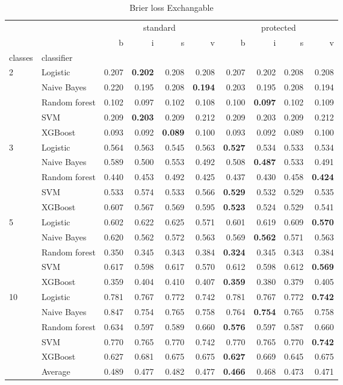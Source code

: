 \begin{table}
\caption{Brier loss Exchangable}
\begin{tabular}{l|l|rrrr|rrrr}
\toprule
 &  & \multicolumn{4}{c}{standard} & \multicolumn{4}{c}{protected} \\
 &  & b & i & s & v & b & i & s & v \\
classes & classifier &  &  &  &  &  &  &  &  \\
\midrule
\midrule
\multirow[c]{5}{*}{2} & Logistic & 0.207 & \textbf{0.202} & 0.208 & 0.208 & 0.207 & 0.202 & 0.208 & 0.208 \\
 & Naive Bayes & 0.220 & 0.195 & 0.208 & \textbf{0.194} & 0.203 & 0.195 & 0.208 & 0.194 \\
 & Random forest & 0.102 & 0.097 & 0.102 & 0.108 & 0.100 & \textbf{0.097} & 0.102 & 0.109 \\
 & SVM & 0.209 & \textbf{0.203} & 0.209 & 0.212 & 0.209 & 0.203 & 0.209 & 0.212 \\
 & XGBoost & 0.093 & 0.092 & \textbf{0.089} & 0.100 & 0.093 & 0.092 & 0.089 & 0.100 \\
\midrule
\multirow[c]{5}{*}{3} & Logistic & 0.564 & 0.563 & 0.545 & 0.563 & \textbf{0.527} & 0.534 & 0.533 & 0.534 \\
 & Naive Bayes & 0.589 & 0.500 & 0.553 & 0.492 & 0.508 & \textbf{0.487} & 0.533 & 0.491 \\
 & Random forest & 0.440 & 0.453 & 0.492 & 0.425 & 0.437 & 0.430 & 0.458 & \textbf{0.424} \\
 & SVM & 0.533 & 0.574 & 0.533 & 0.566 & \textbf{0.529} & 0.532 & 0.529 & 0.535 \\
 & XGBoost & 0.607 & 0.567 & 0.569 & 0.595 & \textbf{0.523} & 0.524 & 0.529 & 0.541 \\
\midrule
\multirow[c]{5}{*}{5} & Logistic & 0.602 & 0.622 & 0.625 & 0.571 & 0.601 & 0.619 & 0.609 & \textbf{0.570} \\
 & Naive Bayes & 0.620 & 0.562 & 0.572 & 0.563 & 0.569 & \textbf{0.562} & 0.571 & 0.563 \\
 & Random forest & 0.350 & 0.345 & 0.343 & 0.384 & \textbf{0.324} & 0.345 & 0.343 & 0.384 \\
 & SVM & 0.617 & 0.598 & 0.617 & 0.570 & 0.612 & 0.598 & 0.612 & \textbf{0.569} \\
 & XGBoost & 0.359 & 0.404 & 0.410 & 0.407 & \textbf{0.359} & 0.380 & 0.379 & 0.405 \\
\midrule
\multirow[c]{5}{*}{10} & Logistic & 0.781 & 0.767 & 0.772 & 0.742 & 0.781 & 0.767 & 0.772 & \textbf{0.742} \\
 & Naive Bayes & 0.847 & 0.754 & 0.765 & 0.758 & 0.764 & \textbf{0.754} & 0.765 & 0.758 \\
 & Random forest & 0.634 & 0.597 & 0.589 & 0.660 & \textbf{0.576} & 0.597 & 0.587 & 0.660 \\
 & SVM & 0.770 & 0.765 & 0.770 & 0.742 & 0.770 & 0.765 & 0.770 & \textbf{0.742} \\
 & XGBoost & 0.627 & 0.681 & 0.675 & 0.675 & \textbf{0.627} & 0.669 & 0.645 & 0.675 \\\midrule\ & Average & 0.489 & 0.477 & 0.482 & 0.477 & \textbf{0.466} & 0.468 & 0.473 & 0.471 \\
\bottomrule
\end{tabular}
\end{table}

